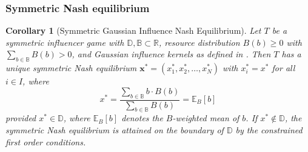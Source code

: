 \documentclass{article}
\newtheorem{corollary}{Corollary}[theorem]
\begin{document}
            \subsubsection{Symmetric Nash equilibrium}
            \begin{corollary}[Symmetric Gaussian Influence Nash 
            Equilibrium]\label{cor:SI_stability_Gaussian}
                Let $T$ be a symmetric influencer game with $\mathbb{D}, \mathbb{B} \subset \mathbb{R}$, resource distribution $B(b) \geq 0$ with $\sum_{b\in\mathbb{B}} B(b) > 0$, and Gaussian influence kernels as defined in . Then $T$ has a unique symmetric Nash equilibrium $\mathbf{x}^* = (x_1^*,x_2^*,\dots,x_N^*)$ with $x_i^* = x^*$ for all $i \in I$, where
                \begin{equation}
                    x^* = \frac{\sum_{b\in\mathbb{B}} b \cdot B(b)}{\sum_{b\in\mathbb{B}} B(b)}
                    = \mathbb{E}_B[b]
                \end{equation}
                provided $x^* \in \mathbb{D}$, where $\mathbb{E}_B[b]$ denotes the $B$-weighted mean of $b$. If $x^* \notin \mathbb{D}$, the symmetric Nash equilibrium is attained on the boundary of $\mathbb{D}$ by the constrained first order conditions.
            \end{corollary}
\end{document}
